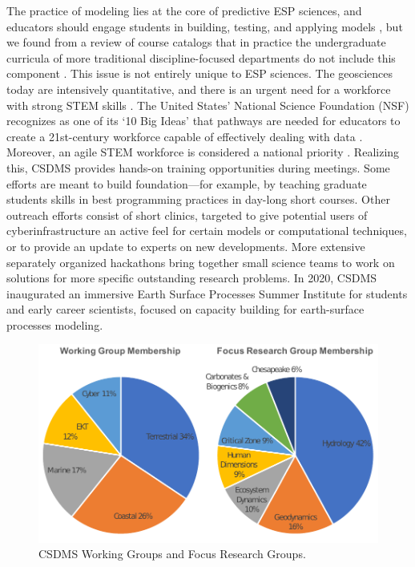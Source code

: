 \documentclass[12pt]{amsart}
\begin{document}
The practice of modeling lies at the core of predictive ESP sciences, and educators should engage students in building, testing, and applying models \citep{hestenes1996modeling,manduca2008making}, but we found from a review of course catalogs that in practice the undergraduate curricula of more traditional discipline-focused departments do not include this component \citep{campbell2013taking}. This issue is not entirely unique to ESP sciences. The geosciences today are intensively quantitative, and there is an urgent need for a workforce with strong STEM skills \citep{national2012discipline}. The United States' National Science Foundation (NSF) recognizes as one of its `10 Big Ideas' that pathways are needed for educators to create a 21st-century workforce capable of effectively dealing with data \citep{king2017reimagining}. Moreover, an agile STEM workforce is considered a national priority \citep{atkins2011national}. Realizing this, CSDMS provides hands-on training opportunities during meetings. Some efforts are meant to build foundation---for example, by teaching graduate students skills in best programming practices in day-long short courses. Other outreach efforts consist of short clinics, targeted to give potential users of cyberinfrastructure an active feel for certain models or computational techniques, or to provide an update to experts on new developments. More extensive separately organized hackathons bring together small science teams to work on solutions for more specific outstanding research problems.  In 2020, CSDMS inaugurated an immersive Earth Surface Processes Summer Institute for students and early career scientists, focused on capacity building for earth-surface processes modeling.

\begin{figure}[h!]
\centering
\includegraphics[scale=0.9]{Figures/working_and_focus_groups.pdf}
\caption{CSDMS Working Groups and Focus Research Groups.}
\label{fig:groups}
\end{figure}
\end{document}
